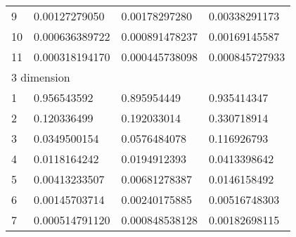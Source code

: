 \begin{table}[b]
\begin{tabular}{llll}
9     & 0.00127279050   & 0.00178297280   & 0.00338291173   \\
10    & 0.000636389722  & 0.000891478237  & 0.00169145587   \\
11    & 0.000318194170  & 0.000445738098  & 0.000845727933  \\
\hline
\multicolumn{4}{l}{3 dimension}\\
\hline
1     & 0.956543592     & 0.895954449     & 0.935414347 \\
2     & 0.120336499     & 0.192033014     & 0.330718914\\
3     & 0.0349500154    & 0.0576484078    & 0.116926793\\
4     & 0.0118164242    & 0.0194912393    & 0.0413398642\\
5     & 0.00413233507   & 0.00681278387   & 0.0146158492\\
6     & 0.00145703714   & 0.00240175885   & 0.00516748303\\
7     & 0.000514791120  & 0.000848538128 & 0.00182698115\\
\end{tabular}
\end{table}


